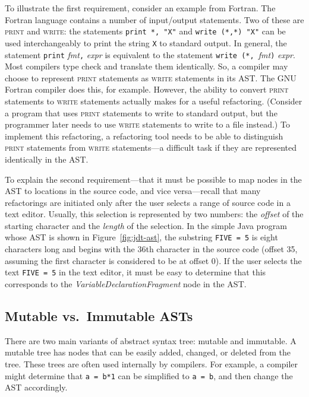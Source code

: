\documentclass[prodmode]{acmlarge}
\newcommand{\ttt}[1]{\texttt{#1}}
\begin{document}
To illustrate the first requirement, consider an example from Fortran.  The
Fortran language contains a number of input/output statements.  Two of these
are \textsc{print} and \textsc{write}: the statements \ttt{print *, "X"} and
\ttt{write (*,*) "X"} can be used interchangeably to print the string \ttt{X}
to standard output.  In general, the statement \ttt{print} \textit{fmt}\ttt{,}
\textit{expr} is equivalent to the statement \ttt{write (*,
}\textit{fmt}\ttt{)} \textit{expr}.  Most compilers type check and translate
them identically.  So, a compiler may choose to represent \textsc{print}
statements as \textsc{write} statements in its AST.  The GNU Fortran compiler
does this, for example.  However, the ability to convert \textsc{print}
statements to \textsc{write} statements actually makes for a useful
refactoring.  (Consider a program that uses \textsc{print} statements to write
to standard output, but the programmer later needs to use \textsc{write}
statements to write to a file instead.) To implement this refactoring, a
refactoring tool needs to be able to distinguish \textsc{print} statements from
\textsc{write} statements---a difficult task if they are represented
identically in the AST.

To explain the second requirement---that it must be possible to map nodes in
the AST to locations in the source code, and vice versa---recall that many
refactorings are initiated only after the user selects a range of source code
in a text editor.  Usually, this selection is represented by two numbers: the
\textit{offset} of the starting character and the \textit{length} of the
selection.  In the simple Java program whose AST is shown in
Figure~\ref{fig:jdt-ast}, the substring \ttt{FIVE = 5} is eight characters long
and begins with the 36th character in the source code (offset 35, assuming the
first character is considered to be at offset 0).  If the user selects the text
\ttt{FIVE = 5} in the text editor, it must be easy to determine that this
corresponds to the \textit{VariableDeclarationFragment} node in the AST.


\subsection{Mutable vs.\ Immutable ASTs}
\label{ss:manip}

There are two main variants of abstract syntax tree:
mutable and immutable. A mutable tree has nodes that can be easily added, 
changed, or deleted from the tree. These trees are often used internally by
compilers. For example, a compiler might determine that
\ttt{a~=~b*1} can be simplified to \ttt{a~=~b}, and then change the AST 
accordingly.
\end{document}
